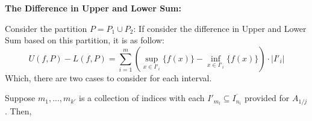 \documentclass{article}
\begin{document}
\begin{itemize}
    \hfill

    \textbf{The Difference in Upper and Lower Sum:}

    Consider the partition $P=P_1\cup P_2$: If consider the difference in Upper and Lower Sum based on this partition, it is as follow:
    $$U(f,P)-L(f,P)=\sum_{i=1}^{m}\left(\sup_{x\in I'_i}\{f(x)\}-\inf_{x\in I'_i}\{f(x)\}\right)\cdot |I'_i|$$
    Which, there are two cases to consider for each interval.

    \hfill

    Suppose $m_1,...,m_{k'}$ is a collection of indices with each $I'_{m_l}\subseteq \overline{I_{n_i}}$ provided for $A_{1/j}$.
    Then, 


    
\end{itemize}
\end{document}
